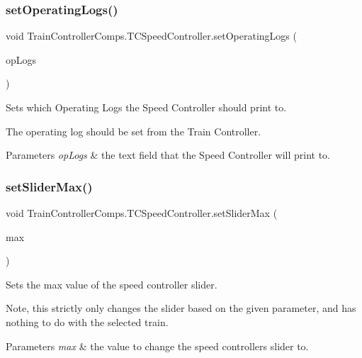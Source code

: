 \subsubsection{\texorpdfstring{set\+Operating\+Logs()}{setOperatingLogs()}}
{\footnotesize\ttfamily void Train\+Controller\+Comps.\+T\+C\+Speed\+Controller.\+set\+Operating\+Logs (\begin{DoxyParamCaption}\item[{J\+Text\+Area}]{op\+Logs }\end{DoxyParamCaption})}



Sets which Operating Logs the Speed Controller should print to. 

The operating log should be set from the Train Controller.


\begin{DoxyParams}{Parameters}
{\em op\+Logs} & the text field that the Speed Controller will print to. \\
\hline
\end{DoxyParams}
\mbox{\label{classTrainControllerComps_1_1TCSpeedController_a1373bc000dd8c13b47d9a298c383dd7e}} 
\subsubsection{\texorpdfstring{set\+Slider\+Max()}{setSliderMax()}}
{\footnotesize\ttfamily void Train\+Controller\+Comps.\+T\+C\+Speed\+Controller.\+set\+Slider\+Max (\begin{DoxyParamCaption}\item[{int}]{max }\end{DoxyParamCaption})}



Sets the max value of the speed controller slider. 

Note, this strictly only changes the slider based on the given parameter, and has nothing to do with the selected train.


\begin{DoxyParams}{Parameters}
{\em max} & the value to change the speed controller\textquotesingle{}s slider to. \\
\hline
\end{DoxyParams}
\mbox{\label{classTrainControllerComps_1_1TCSpeedController_a85b0846fba0d3db24f1719437ad854d9}} 
